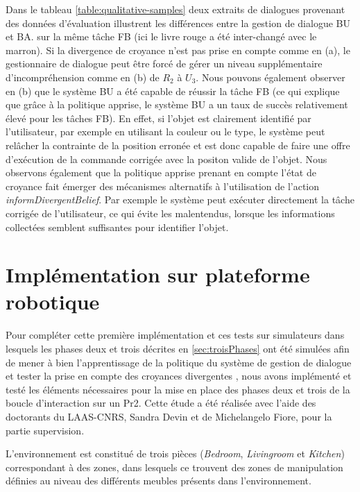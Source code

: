 \documentclass[a4paper,11pt,twoside]{StyleThese}
\begin{document}
%
Dans le tableau \ref{table:qualitative-samples} deux extraits de dialogues provenant des données d'évaluation illustrent les différences entre la gestion de dialogue BU et BA. sur la même tâche FB (ici le livre rouge a été inter-changé avec le marron). Si la divergence de croyance n'est pas prise en compte comme en (a), le gestionnaire de dialogue peut être forcé de gérer un niveau supplémentaire d'incompréhension comme en (b) de $R_2$ à $U_3$. 
Nous pouvons également observer en (b) que le système BU a été capable de réussir la tâche FB (ce qui explique que grâce à la politique apprise, le système BU a un taux de succès relativement élevé pour les tâches FB). En effet, si l'objet est clairement identifié par l'utilisateur, par exemple en utilisant la couleur ou le type, le système peut relâcher la contrainte de la position erronée et est donc capable de faire une offre d'exécution de la commande corrigée avec la positon valide de l'objet.
Nous observons également que la politique apprise prenant en compte l'état de croyance fait émerger des mécanismes alternatifs à l'utilisation de l'action \textit{informDivergentBelief}. Par exemple le système peut exécuter directement la tâche corrigée de l'utilisateur, ce qui évite les malentendus, lorsque les informations collectées semblent suffisantes pour identifier l'objet.



\section{Implémentation sur plateforme robotique}


Pour compléter cette première implémentation et ces tests sur simulateurs dans lesquels les phases deux et trois décrites en \ref{sec:troisPhases} ont été simulées afin de mener à bien l'apprentissage de la politique du système de gestion de dialogue \cite{simpar_2014} et tester la prise en compte des croyances divergentes \cite{Ferreira2015}, nous avons implémenté et testé les éléments nécessaires pour la mise en place des phases deux et trois de la boucle d'interaction sur un Pr2.
Cette étude a été réalisée avec l'aide des doctorants du LAAS-CNRS, Sandra Devin et de Michelangelo Fiore, pour la partie supervision.

L'environnement est constitué de trois pièces (\textit{Bedroom}, \textit{Livingroom} et \textit{Kitchen}) correspondant à des zones, dans lesquels ce trouvent des zones de manipulation définies au niveau des différents meubles présents dans l'environnement.
\end{document}
